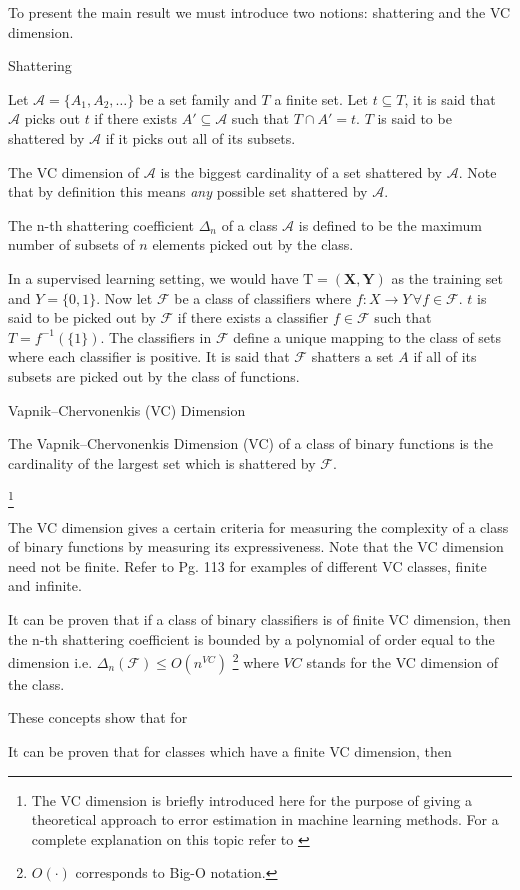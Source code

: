 To present the main result we must introduce two notions:
shattering and the VC dimension.

\begin{definition}{Shattering}

Let $\mathcal {A}= \{A_1,A_{2},\dots \}$ be a set family and $T$ a finite set. Let $t \subseteq T$, it is said that $\mathcal {A}$ picks out $t$ if there exists $A' \subseteq \mathcal {A} $ such that $ T \cap A' = t$. $T$ is said to be shattered by $\mathcal {A}$ if it picks out all of its subsets.

The VC dimension of $\mathcal {A}$ is the biggest cardinality of a set shattered by $\mathcal {A}$. Note that by definition this means \textit{any} possible set shattered by $\mathcal {A}$.
\end{definition}
 
The n-th shattering coefficient $\Delta_n$ of a class $\mathcal {A}$ is defined to be the maximum number of subsets of $n$ elements picked out by the class. 

In a supervised learning setting, we would have $\mathrm{T} = (\textbf{X},\textbf{Y})$ as the training set and $Y = \{0,1 \}$. Now let $\mathcal {F}$ be a class of classifiers where $f: X \rightarrow Y \, \forall f \in \mathcal {F}$. $t$ is said to be picked out by $\mathcal {F}$ if there exists a classifier $f \in \mathcal {F}$ such that $T = f^{-1}(\{1\})$. The classifiers in $\mathcal {F}$ define a unique mapping to the class of sets where each classifier is positive. It is said that $\mathcal {F}$ shatters a set $A$ if all of its subsets are picked out by the class of functions.

\begin{definition}{Vapnik–Chervonenkis (VC) Dimension}
 	
The Vapnik–Chervonenkis Dimension (VC) of a class of binary functions is the cardinality of the largest set which is shattered by $\mathcal {F}$.
\end{definition}\footnote{The VC dimension is briefly introduced here for the purpose of giving a theoretical approach to error estimation in machine learning methods. For a complete explanation on this topic refer to \cite{vapnik-nature2013}}

The VC dimension gives a certain criteria for measuring the complexity of a class of binary functions by measuring its expressiveness. Note that the VC dimension need not be finite. Refer to \cite{cherkassky-learning2007} Pg. 113 for examples of different VC classes, finite and infinite.

It can be proven that if a class of binary classifiers is of finite VC dimension, then the n-th shattering coefficient is bounded by a polynomial of order equal to the dimension 
i.e. $\Delta_n(\mathcal {F}) \leq O(n^{VC})$ \footnote{$O(\cdot)$ corresponds to Big-O notation.} where $VC$ stands for the VC dimension of the class.

These concepts show that for

It can be proven that for classes which have a finite VC dimension, then

